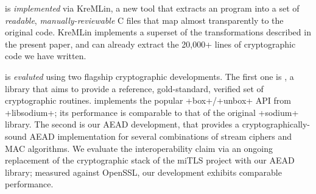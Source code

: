\lowstar is \emph{implemented} via KreMLin, a new tool that extracts an \fstar
program into a set of \emph{readable}, \emph{manually-reviewable} C files that
map almost transparently to the original code. KreMLin implements a superset of
the transformations described in the present paper, and can already extract
the 20,000+ lines of cryptographic code we have written.

\lowstar is \emph{evaluted} using two flagship cryptographic developments.
The first one is \haclstar,
a \lowstar library that aims to provide a reference, gold-standard, verified set of
cryptographic routines.
\haclstar implements the popular \li+box+/\li+unbox+ API
from \li+libsodium+; its performance is comparable to that of the original
\li+sodium+ library. The second is our AEAD
development, that provides a
cryptographically-sound AEAD implementation for several combinations of stream
ciphers and MAC algorithms. We evaluate the interoperability claim via an
ongoing replacement of the cryptographic stack of the miTLS project with our
AEAD library; measured against OpenSSL, our development exhibits comparable
performance.


\fi





